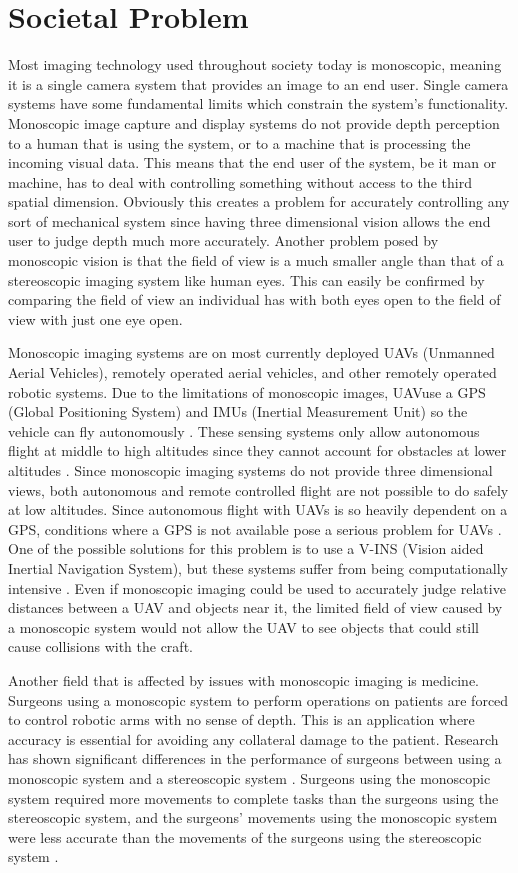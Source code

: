 \documentclass[12pt, journal]{IEEEtran}
\begin{document}
\section{Societal Problem}
Most imaging technology used throughout society today is monoscopic, meaning it is a single camera system that provides an image to an end user. Single camera systems have some fundamental limits which constrain the system's functionality. Monoscopic image capture and display systems do not provide depth perception to a human that is using the system, or to a machine that is processing the incoming visual data. This means that the end user of the system, be it man or machine, has to deal with controlling something without access to the third spatial dimension. Obviously this creates a problem for accurately controlling any sort of mechanical system since having three dimensional vision allows the end user to judge depth much more accurately. Another problem posed by monoscopic vision is that the field of view is a much smaller angle than that of a stereoscopic imaging system like human eyes. This can easily be confirmed by comparing the field of view an individual has with both eyes open to the field of view with just one eye open.

Monoscopic imaging systems are on most currently deployed UAVs (Unmanned Aerial Vehicles), remotely operated aerial vehicles, and other remotely operated robotic systems. Due to the limitations of monoscopic images, UAVuse a GPS (Global Positioning System) and IMUs (Inertial Measurement Unit) so the vehicle can fly autonomously \cite{sanfourche}. These sensing systems only allow autonomous flight at middle to high altitudes since they cannot account for obstacles at lower altitudes \cite{sanfourche}. Since monoscopic imaging systems do not provide three dimensional views, both autonomous and remote controlled flight are not possible to do safely at low altitudes. Since autonomous flight with UAVs is so heavily dependent on a GPS, conditions where a GPS is not available pose a serious problem for UAVs \cite{chowdhary}. One of the possible solutions for this problem is to use a V-INS (Vision aided Inertial Navigation System), but these systems suffer from being computationally intensive \cite{chowdhary}. Even if monoscopic imaging could be used to accurately judge relative distances between a UAV and objects near it, the limited field of view caused by a monoscopic system would not allow the UAV to see objects that could still cause collisions with the craft.

Another field that is affected by issues with monoscopic imaging is medicine. Surgeons using a monoscopic system to perform operations on patients are forced to control robotic arms with no sense of depth. This is an application where accuracy is essential for avoiding any collateral damage to the patient. Research has shown significant differences in the performance of surgeons between using a monoscopic system and a stereoscopic system \cite{munz}. Surgeons using the monoscopic system required more movements to complete tasks than the surgeons using the stereoscopic system, and the surgeons' movements using the monoscopic system were less accurate than the movements of the surgeons using the stereoscopic system \cite{munz}.
\end{document}
